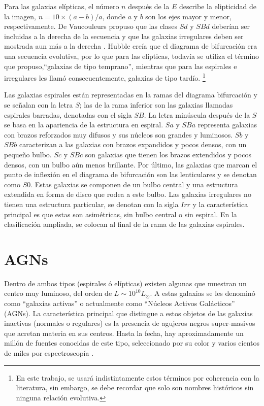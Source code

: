 \bigskip

\noindent Para las galaxias elípticas, el número $n$ después de la $E$ describe la elipticidad de la imagen, $n = 10 \times (a - b) / a$,
donde $a$ y $b$ son los ejes mayor y menor, respectivamente. De Vaucouleurs  propuso que las clases $Sd$ y $SBd$
deberían ser incluidas a la derecha de la secuencia y que las galaxias irregulares deben ser mostrada aun más a la derecha \citep{devaucouleurs1961}. Hubble creía que el diagrama de bifurcación era una secuencia evolutiva, por lo que para las elípticas, todavía se utiliza el término que propuso,``galaxias de tipo temprano'', mientras que para las espirales e irregulares les llamó consecuentemente, galaxias de tipo tardío. \footnote{ En este trabajo, se usará indistintamente estos términos por coherencia con la literatura, sin embargo, se debe recordar que solo son nombres históricos sin ninguna relación evolutiva.}


\bigskip

\noindent Las galaxias espirales están representadas en la ramas del diagrama bifurcación y se señalan con la letra $S$; las de la rama inferior son las  galaxias llamadas  espirales barradas, denotadas con el sigla $SB$. La letra minúscula después de la $S$ se basa en la apariencia de la estructura en espiral. $Sa$ y $SBa$ representa galaxias con brazos reforzados muy difusos y sus núcleos son grandes y luminosos. $Sb$ y $SBb$ caracterizan a las galaxias con brazos expandidos y pocos densos, con un pequeño bulbo. $Sc$ y $SBc$ son galaxias que tienen los brazos extendidos y pocos densos, con un bulbo aún menos brillante. Por último, las galaxias que marcan el punto de inflexión en el diagrama de bifurcación son las lenticulares y se denotan como $S0$. Estas galaxias se componen de un bulbo central y una estructura extendida en forma de disco que rodea a este bulbo. Las galaxias irregulares no tienen una estructura particular, se denotan con la sigla $Irr$ y la característica principal es que estas son asimétricas, sin bulbo central o sin espiral. En la clasificación ampliada, se colocan al final de la rama de las galaxias espirales.



\section{AGNs}

Dentro de ambos tipos (espirales ó elípticas) existen algunas que muestran un centro muy luminoso, del orden de $L \sim 10^{10} L_{\odot}$. A estas galaxias se les denominó como ``galaxias activas'' o actualmente como ``Núcleos Activos Galácticos'' (AGNs).
La característica principal que distingue a estos objetos de las galaxias inactivas (normales o regulares) es
la presencia de agujeros negros super-masivos que acretan materia en sus centros. Hasta la fecha, hay aproximadamente un millón de fuentes
conocidas de este tipo, seleccionado por su color y varios cientos de miles por espectroscopía \citep{santini2012}.

